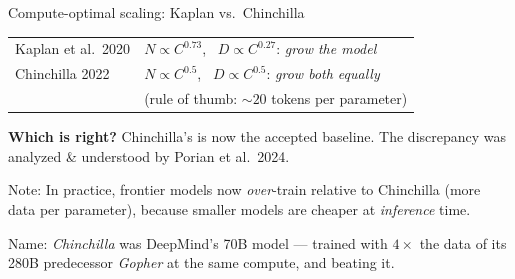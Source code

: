 \documentclass[11pt]{beamer}
\newcommand{\hl}[1]{{\color{blue!60!black}\textbf{#1}}}
\begin{document}
\begin{frame}{Compute-optimal scaling: Kaplan vs.\ Chinchilla}
  \begin{center}
  \begin{tabular}{l|l}
    Kaplan et al.\ 2020 & $N \propto C^{0.73}$, \ $D \propto C^{0.27}$:
    \emph{grow the model} \\
    Chinchilla 2022 &  $N \propto C^{0.5}$, \ $D \propto C^{0.5}$:
    \emph{grow both equally} \\
    & (rule of thumb: $\sim 20$ tokens per parameter)  \pause
  \end{tabular}
  \end{center}
  \vspace{1mm}

  \hl{Which is right?} Chinchilla's is now the accepted baseline.
 The discrepancy was analyzed \& understood by Porian et al.\ 2024.  \pause
  

\medskip

  Note: In practice, frontier models now \emph{over}-train relative to
  Chinchilla (more data per parameter), because smaller models are cheaper at
  \emph{inference} time.
\medskip

  {\footnotesize Name: \emph{Chinchilla} was DeepMind's 70B model ---
  trained with $4\times$ the data of its 280B predecessor \emph{Gopher}
  at the same compute, and beating it.}
\end{frame}
\end{document}

